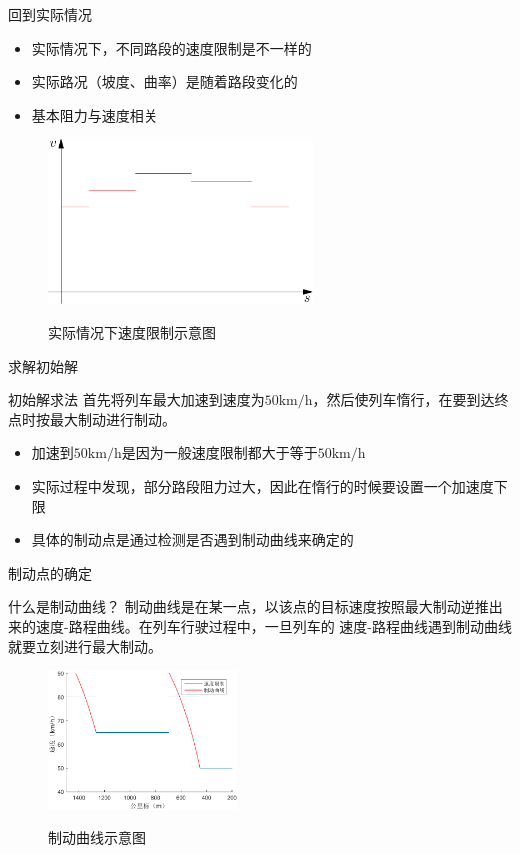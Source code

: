 \documentclass{beamer}
\begin{document}
\begin{frame}{回到实际情况}

\begin{itemize}
  \item 实际情况下，不同路段的速度限制是不一样的
  \item 实际路况（坡度、曲率）是随着路段变化的
  \item 基本阻力与速度相关
\end{itemize}

\begin{figure}
  \centering
  \includegraphics[width=7cm]{fig/fig5/fig5.pdf}\\
  \caption{实际情况下速度限制示意图}
\end{figure}

\end{frame}

\begin{frame}{求解初始解}
\begin{block}{初始解求法}
首先将列车最大加速到速度为$50 \mathrm{km/h}$，然后使列车惰行，在要到达终点时按最大制动进行制动。
\end{block}
\begin{itemize}
  \item 加速到$50 \mathrm{km/h}$是因为一般速度限制都大于等于$50 \mathrm{km/h}$
  \item 实际过程中发现，部分路段阻力过大，因此在惰行的时候要设置一个加速度下限
  \item 具体的制动点是通过检测是否遇到制动曲线来确定的
\end{itemize}
\end{frame}

\begin{frame}{制动点的确定}
\begin{block}{什么是制动曲线？}
制动曲线是在某一点，以该点的目标速度按照最大制动逆推出来的速度-路程曲线。在列车行驶过程中，一旦列车的
速度-路程曲线遇到制动曲线就要立刻进行最大制动。
\end{block}
\begin{figure}
  \centering
  \includegraphics[width=5cm]{fig/fig6/fig6.pdf}\\
  \caption{制动曲线示意图}
\end{figure}

\end{frame}
\end{document}
